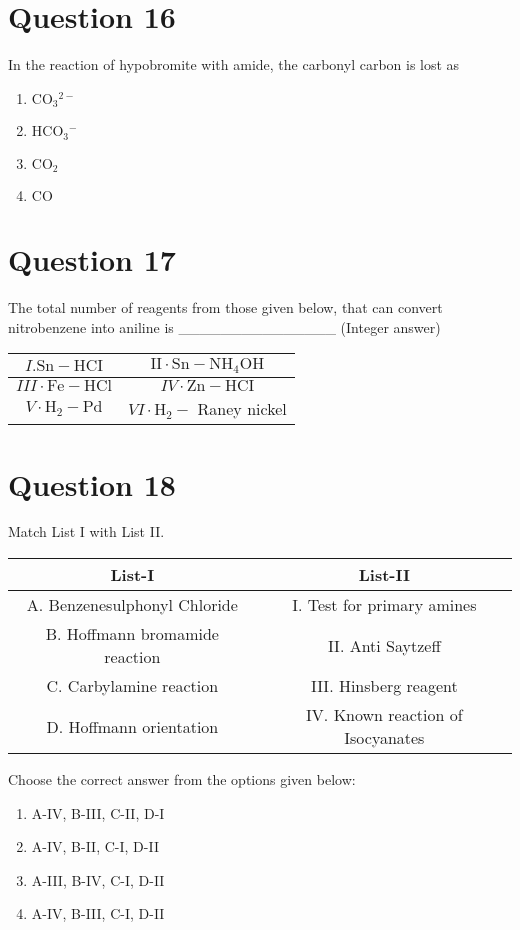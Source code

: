 \documentclass{article}
\begin{document}
\section*{Question 16}
In the reaction of hypobromite with amide, the carbonyl carbon is lost as 
\begin{enumerate}[label=(\alph*)]
\item \(\mathrm{CO}_3{ }^{2-}\)
\item \(\mathrm{HCO}_3{ }^{-}\)
\item \(\mathrm{CO}_2\)
\item \(\mathrm{CO}\)
\end{enumerate}
\newpage
\section*{Question 17}
The total number of reagents from those given below, that can convert nitrobenzene into aniline is _______________ (Integer answer)
    \setlength{\arrayrulewidth}{1mm}
    \begin{tabular}{|c|c|}
    \hline
    \(I . \mathrm{Sn}-\mathrm{HCI}\) & \(\mathrm{II} \cdot \mathrm{Sn}-\mathrm{NH}_4 \mathrm{OH}\) \\
\hline
\(I I I \cdot \mathrm{Fe}-\mathrm{HCl}\) & \(I V \cdot \mathrm{Zn}-\mathrm{HCI}\) \\
\hline
\(V \cdot \mathrm{H}_2-\mathrm{Pd}\) & \(V I \cdot \mathrm{H}_2-\) Raney nickel \\
\hline

    \end{tabular}
    \setlength{\arrayrulewidth}{0.4mm}
    
\begin{enumerate}[label=(\alph*)]
\end{enumerate}
\newpage
\section*{Question 18}
Match List I with List II.
    \setlength{\arrayrulewidth}{1mm}
    \begin{tabular}{|c|c|}
    \hline
    List-I & List-II \\
\hline
A. Benzenesulphonyl Chloride & I. Test for primary amines \\
\hline
B. Hoffmann bromamide reaction & II. Anti Saytzeff \\
\hline
C. Carbylamine reaction & III. Hinsberg reagent \\
\hline
D. Hoffmann orientation & IV. Known reaction of Isocyanates \\
\hline

    \end{tabular}
    \setlength{\arrayrulewidth}{0.4mm}
    Choose the correct answer from the options given below: \newline
\begin{enumerate}[label=(\alph*)]
\item A-IV, B-III, C-II, D-I
\item A-IV, B-II, C-I, D-II
\item A-III, B-IV, C-I, D-II
\item A-IV, B-III, C-I, D-II
\end{enumerate}
\newpage
\end{document}
